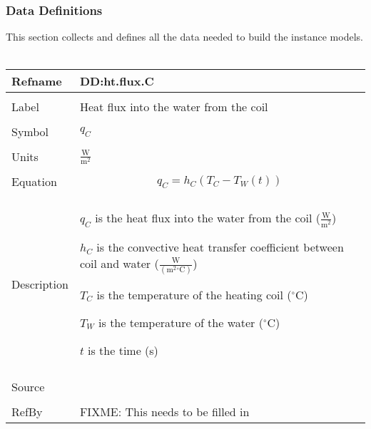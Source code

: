 \documentclass[12pt]{article}
\begin{document}
\subsubsection{Data Definitions}
\label{Sec:DDs}
This section collects and defines all the data needed to build the instance models.
~\newline
\noindent \begin{minipage}{\textwidth}
\begin{tabular}{p{} p{}}
\toprule \textbf{Refname} & \textbf{DD:ht.flux.C}
\label{DD:ht.flux.C}
\\ \midrule \\
Label & Heat flux into the water from the coil
\\ \midrule \\
Symbol & ${q_{C}}$
\\ \midrule \\
Units & $\frac{\text{W}}{\text{m}^{2}}$
\\ \midrule \\
Equation & \begin{dmath}
           {q_{C}}={h_{C}} \left({T_{C}}-{T_{W}}\left(t\right)\right)
           \end{dmath}
\\ \midrule \\
Description & \begin{symbDescription}
              \item{${q_{C}}$ is the heat flux into the water from the coil ($\frac{\text{W}}{\text{m}^{2}}$)}
              \item{${h_{C}}$ is the convective heat transfer coefficient between coil and water ($\frac{\text{W}}{(\text{m}^{2}{}^{\circ}\text{C})}$)}
              \item{${T_{C}}$ is the temperature of the heating coil (${}^{\circ}$C)}
              \item{${T_{W}}$ is the temperature of the water (${}^{\circ}$C)}
              \item{$t$ is the time (s)}
              \end{symbDescription}
\\ \midrule \\
Source & 
\\ \midrule \\
RefBy & FIXME: This needs to be filled in
\\ \bottomrule \end{tabular}
\end{minipage}\\
\end{document}
